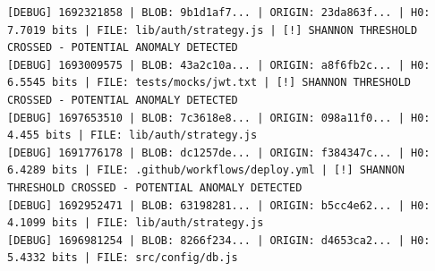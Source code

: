 \documentclass[12pt, a4paper, oneside]{report}
\begin{document}
\begin{lstlisting}[basicstyle=\tiny\ttfamily]
[DEBUG] 1692321858 | BLOB: 9b1d1af7... | ORIGIN: 23da863f... | H0: 7.7019 bits | FILE: lib/auth/strategy.js | [!] SHANNON THRESHOLD CROSSED - POTENTIAL ANOMALY DETECTED
[DEBUG] 1693009575 | BLOB: 43a2c10a... | ORIGIN: a8f6fb2c... | H0: 6.5545 bits | FILE: tests/mocks/jwt.txt | [!] SHANNON THRESHOLD CROSSED - POTENTIAL ANOMALY DETECTED
[DEBUG] 1697653510 | BLOB: 7c3618e8... | ORIGIN: 098a11f0... | H0: 4.455 bits | FILE: lib/auth/strategy.js
[DEBUG] 1691776178 | BLOB: dc1257de... | ORIGIN: f384347c... | H0: 6.4289 bits | FILE: .github/workflows/deploy.yml | [!] SHANNON THRESHOLD CROSSED - POTENTIAL ANOMALY DETECTED
[DEBUG] 1692952471 | BLOB: 63198281... | ORIGIN: b5cc4e62... | H0: 4.1099 bits | FILE: lib/auth/strategy.js
[DEBUG] 1696981254 | BLOB: 8266f234... | ORIGIN: d4653ca2... | H0: 5.4332 bits | FILE: src/config/db.js
\end{lstlisting}
\newpage
\end{document}
